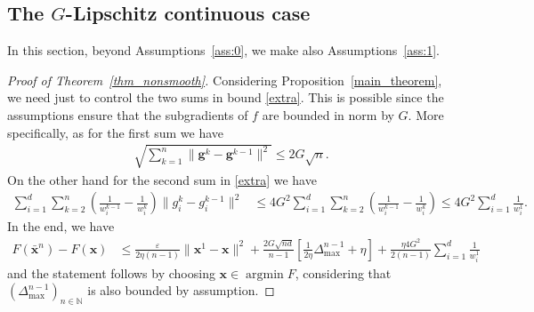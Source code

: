 \documentclass[11pt]{article}
\theoremstyle{plain}
\theoremstyle{definition}
\theoremstyle{remark}
\newcommand{\norm}[1]{\lVert{#1}\rVert}
\DeclareMathOperator*{\argmin}{argmin}
\newcommand{\m}{d}
\newcommand{\bx}{\bm{x}}
\newcommand{\buu}{\bm{g}}
\newcommand{\uu}{g}
\newcommand{\w}{w}
\newcommand{\iter}{n}
\newcommand{\ite}{k}
\newcommand{\N}{\mathbb{N}}
\begin{document}
\subsection{The $G$-Lipschitz continuous case}
\label{sec:analysis_a}
In this section, beyond Assumptions~\ref{ass:0}, we make also Assumptions~\ref{ass:1}.
\begin{proof}[Proof of Theorem~\ref{thm_nonsmooth}]
Considering Proposition~\ref{main_theorem}, we need just to control the two sums in bound \eqref{extra}. 
This is possible since the assumptions ensure that the subgradients of $f$ are bounded in norm by $G$.
More specifically, as for the first sum we have
\begin{align*}
\sqrt{ \sum_{\ite=1}^\iter \norm{\buu^\ite - \buu^{\ite-1}}^2} \leq 2 G \sqrt{n}.
\end{align*}
On the other hand for the second sum in \eqref{extra} we have
\begin{align*}
\sum_{i=1}^\m\sum_{\ite=2}^{\iter} \left(\frac{1}{\w_i^{\ite-1}} - \frac{1}{\w_i^\ite}\right)\norm{\uu_i^\ite - \uu_i^{\ite-1}}^2& \leq 4 G^2 \sum_{i=1}^\m
\sum_{\ite=2}^{\iter} \left(\frac{1}{\w_i^{\ite-1}} - \frac{1}{\w_i^\ite}\right) \leq 4 G^2 \sum_{i=1}^\m \frac{1}{\w_i^1}.
\end{align*}
In the end, we have
\begin{align*}
F(\bar{\bx}^{\iter}) - F(\bx) & \leq \frac{\varepsilon}{2\eta(\iter-1)}\lVert \bx^1 - \bx\rVert^2 +  \frac{2 G\sqrt{n d}}{\iter-1} \left[\frac{1}{2\eta}\Delta^{\iter-1}_{\max} + \eta \right] +  \frac{\eta 4 G^2}{2(\iter-1)}  \sum_{i=1}^\m \frac{1}{\w_i^1}
\end{align*}
and the statement follows by choosing $\bx\in\argmin F$, considering that $(\Delta^{\iter-1}_{\max})_{\iter\in \N}$ is also bounded by assumption.
\end{proof}
\end{document}
